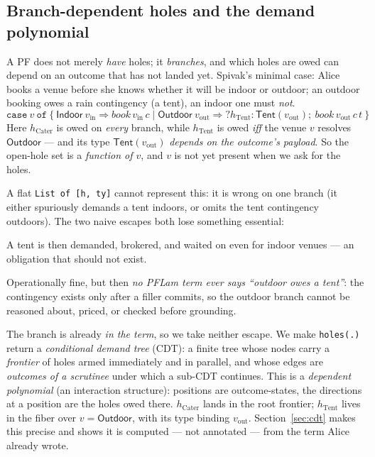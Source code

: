 \documentclass[11pt]{article}
\newcommand{\hole}[2]{\ensuremath{?#1\!:\!#2}}
\begin{document}
\subsection{Branch-dependent holes and the demand polynomial}\label{sec:branch}
A PF does not merely \emph{have} holes; it \emph{branches}, and which holes are owed can depend on an
outcome that has not landed yet. Spivak's minimal case: Alice books a venue before she knows whether
it will be indoor or outdoor; an outdoor booking owes a rain contingency (a tent), an indoor one must
\emph{not}.
\[
  \texttt{case}\ v\ \texttt{of}\ \{\ \mathsf{Indoor}\ v_{\mathrm{in}} \Rightarrow \mathit{book}\,v_{\mathrm{in}}\,c \mid
     \mathsf{Outdoor}\ v_{\mathrm{out}} \Rightarrow \hole{h_{\mathrm{Tent}}}{\mathsf{Tent}(v_{\mathrm{out}})};\ \mathit{book}\,v_{\mathrm{out}}\,c\,t\ \}
\]
Here $h_{\mathrm{Cater}}$ is owed on \emph{every} branch, while $h_{\mathrm{Tent}}$ is owed
\emph{iff} the venue $v$ resolves $\mathsf{Outdoor}$ --- and its type $\mathsf{Tent}(v_{\mathrm{out}})$
\emph{depends on the outcome's payload}. So the open-hole set is a \emph{function of $v$}, and $v$ is
not yet present when we ask for the holes.

A flat \lstinline[language=mettail,basicstyle=\ttfamily\small]|List of [h, ty]| cannot represent this:
it is wrong on one branch (it either spuriously demands a tent indoors, or omits the tent contingency
outdoors). The two naive escapes both lose something essential:
\begin{description}[leftmargin=0pt,style=nextline,itemsep=2pt]
  \item[Eager (hoist $h_{\mathrm{Tent}}$ up front).] A tent is then demanded, brokered, and waited on
  even for indoor venues --- an obligation that should not exist.
  \item[Lazy (let the venue filler introduce $h_{\mathrm{Tent}}$ on republish).] Operationally fine,
  but then \emph{no PFLam term ever says ``outdoor owes a tent''}: the contingency exists only after a
  filler commits, so the outdoor branch cannot be reasoned about, priced, or checked before grounding.
\end{description}
The branch is already \emph{in the term}, so we take neither escape. We make
\lstinline[language=mettail,basicstyle=\ttfamily\small]|holes(.)| return a \emph{conditional demand
tree} (CDT): a finite tree whose nodes carry a \emph{frontier} of holes armed immediately and in
parallel, and whose edges are \emph{outcomes of a scrutinee} under which a sub-CDT continues. This is a
\emph{dependent polynomial} (an interaction structure): positions are outcome-states, the directions at
a position are the holes owed there. $h_{\mathrm{Cater}}$ lands in the root frontier; $h_{\mathrm{Tent}}$
lives in the fiber over $v=\mathsf{Outdoor}$, with its type binding $v_{\mathrm{out}}$.
Section~\ref{sec:cdt} makes this precise and shows it is computed --- not annotated --- from the term
Alice already wrote.
\end{document}

